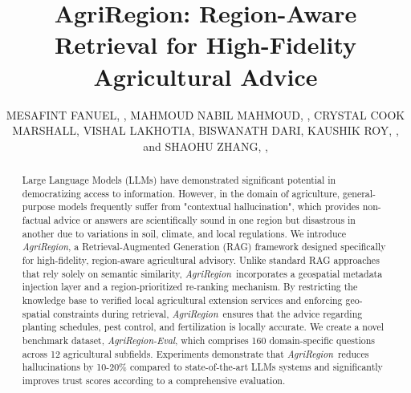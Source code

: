\documentclass{ieeeaccess}
\newcommand{\AgriRegion}{\textit{AgriRegion}}
\begin{document}
\title{AgriRegion: Region-Aware Retrieval for High-Fidelity Agricultural Advice}

\author{
\uppercase{Mesafint Fanuel}, ,
\uppercase{Mahmoud Nabil Mahmoud}, 
,
\uppercase{Crystal Cook Marshall}, 
\uppercase{Vishal Lakhotia}, 
\uppercase{Biswanath Dari}, 
\uppercase{Kaushik Roy}, 
,
and \uppercase{Shaohu Zhang},
,
}

\address[1]{Department of Computer Science, North Carolina Agricultural and Technical State University, Greensboro, NC 27411, USA}
\address[2]{Department of Computer Science, The University of Alabama, Tuscaloosa, AL 35487, USA}
\address[3]{North Carolina State Extension, North Carolina Agricultural and Technical State University, Greensboro, NC 27411, USA}
\address[4]{Amazon, Seattle, WA 98109, USA}




\begin{abstract}
Large Language Models (LLMs) have demonstrated significant potential in democratizing access to information. However, in the domain of agriculture, general-purpose models frequently suffer from "contextual hallucination", which provides non-factual advice or answers are scientifically sound in one region but disastrous in another due to variations in soil, climate, and local regulations. We introduce \AgriRegion, a Retrieval-Augmented Generation (RAG) framework designed specifically for high-fidelity, region-aware agricultural advisory. Unlike standard RAG approaches that rely solely on semantic similarity, \AgriRegion~incorporates a geospatial metadata injection layer and a region-prioritized re-ranking mechanism. By restricting the knowledge base to verified local agricultural extension services and enforcing geo-spatial constraints during retrieval, \AgriRegion~ensures that the advice regarding planting schedules, pest control, and fertilization is locally accurate. We create a novel benchmark dataset, \textit{AgriRegion-Eval}, which comprises
160 domain-specific questions across 12 agricultural subfields.   Experiments demonstrate that \AgriRegion~reduces hallucinations by 10-20\% compared to state-of-the-art LLMs systems and significantly improves trust scores according to a comprehensive evaluation.
\end{abstract}
\end{document}
